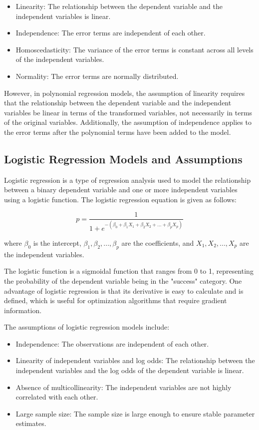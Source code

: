 \documentclass{beamer}
\begin{document}
\begin{itemize}
\item Linearity: The relationship between the dependent variable and the independent variables is linear.
\item Independence: The error terms are independent of each other.
\item Homoscedasticity: The variance of the error terms is constant across all levels of the independent variables.
\item Normality: The error terms are normally distributed.
\end{itemize}

However, in polynomial regression models, the assumption of linearity requires that the relationship between the dependent variable and the independent variables be linear in terms of the transformed variables, not necessarily in terms of the original variables. Additionally, the assumption of independence applies to the error terms after the polynomial terms have been added to the model.


\subsection{Logistic Regression Models and Assumptions}
Logistic regression is a type of regression analysis used to model the relationship between a binary dependent variable and one or more independent variables using a logistic function. The logistic regression equation is given as follows:

\begin{equation}
p = \frac{1}{1 + e^{-(\beta_0 + \beta_1X_1 + \beta_2X_2 + ... + \beta_pX_p)}}
\end{equation}

where $\beta_0$ is the intercept, $\beta_1, \beta_2, ..., \beta_p$ are the coefficients, and $X_1, X_2, ..., X_p$ are the independent variables.

The logistic function is a sigmoidal function that ranges from 0 to 1, representing the probability of the dependent variable being in the "success" category. One advantage of logistic regression is that its derivative is easy to calculate and is defined, which is useful for optimization algorithms that require gradient information.

The assumptions of logistic regression models include:

\begin{itemize}
\item Independence: The observations are independent of each other.
\item Linearity of independent variables and log odds: The relationship between the independent variables and the log odds of the dependent variable is linear.
\item Absence of multicollinearity: The independent variables are not highly correlated with each other.
\item Large sample size: The sample size is large enough to ensure stable parameter estimates.
\end{itemize}
\end{document}
